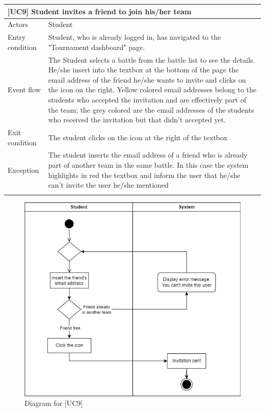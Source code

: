\documentclass[12pt,oneside,a4paper]{article}
\begin{document}
\begin{table}[htbp]
\begin{tabular}{|l|p{12cm}|}
    \hline
    \multicolumn{2}{|l|}{\textbf{[UC9] Student invites a friend to join his/her team}}\\
    \hline
    Actors & Student\\
    \hline
    Entry condition & Student, who is already logged in, has navigated to the "Tournament dashboard" page.\\
    \hline
    Event flow & The Student selects a battle from the battle list to see the details. He/she insert into the textbox at the bottom of the page the email address of the friend he/she wants to invite and clicks on the icon on the right. Yellow colored email addresses belong to the students who accepted the invitation and are effectively part of the team; the grey colored are the email addresses of the students who received the invitation but that didn't accepted yet.\\
    \hline
    Exit condition & The student clicks on the icon at the right of the textbox\\
    \hline
    Exception & The student inserts the email address of a friend who is already part of another team in the same battle. In this case the system highlights in red the textbox and inform the user that he/she can't invite the user he/she mentioned\\
    \lasthline
\end{tabular}
\end{table}

\clearpage

\begin{figure}
    \centering
    \includegraphics[width=1\linewidth]{Images//Diagrams/StudentInvitesFriend.png}
    \caption{Diagram for [UC9]}
    \label{fig:enter-label}
\end{figure}
\end{document}
